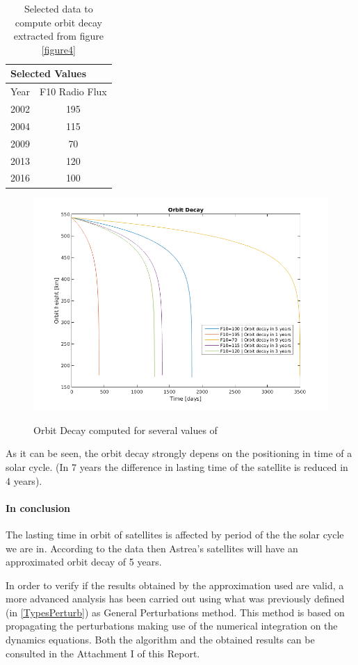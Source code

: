 \begin{table}[]
\centering
\caption{Selected data to compute orbit decay extracted from figure \ref{figure4}}
\label{OrbDecCompT}
\begin{tabular}{|l|c|}
\hline
\multicolumn{2}{|l|}{Selected Values}      \\ \hline
Year & \multicolumn{1}{l|}{F10 Radio Flux} \\ \hline
2002 & 195                                 \\ \hline
2004 & 115                                 \\ \hline
2009 & 70                                  \\ \hline
2013 & 120                                 \\ \hline
2016 & 100                                 \\ \hline
\end{tabular}
\end{table}  
\begin{figure}[H] %
	\centering
	\includegraphics[width=.8\textwidth]{OrbitDecayComp.png}\\
	\caption{Orbit Decay computed for several values of }
	\label{fig:OrbitDecayComp} 
\end{figure}

As it can be seen, the orbit decay strongly depens on the positioning in time of a solar cycle. (In 7 years the difference in lasting time of the satellite is reduced in 4 years).

\paragraph{In conclusion}
The lasting time in orbit of satellites is affected by period of the the solar cycle we are in. According to the data then Astrea's satellites will have an approximated orbit decay of 5 years.

In order to verify if the results obtained by the approximation used are valid, a more advanced analysis has been carried out using what was previously defined (in \ref{TypesPerturb}) as General Perturbations method. This method is based on propagating the perturbations making use of the numerical integration on the dynamics equations. Both the algorithm and the obtained results can be consulted in the Attachment I of this Report.


 
